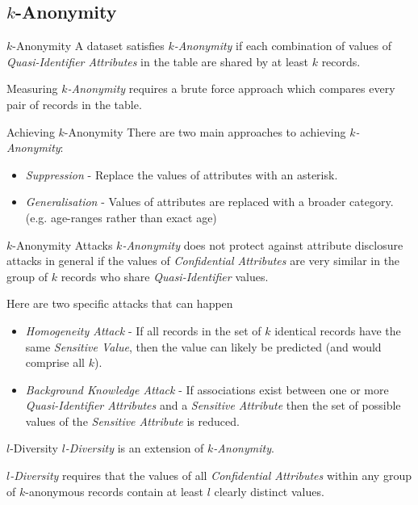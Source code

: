 \documentclass[11pt,a4paper]{article}
\begin{document}
\subsection{$k$-Anonymity}

  \begin{definition}{$k$-Anonymity}
    A dataset satisfies \textit{$k$-Anonymity} if each combination of values of \textit{Quasi-Identifier Attributes} in the table are shared by at least $k$ records.
    \par Measuring \textit{$k$-Anonymity} requires a brute force approach which compares every pair of records in the table.
  \end{definition}

  \begin{proposition}{Achieving $k$-Anonymity}
    There are two main approaches to achieving \textit{$k$-Anonymity}:
    \begin{itemize}
      \item \textit{Suppression} - Replace the values of attributes with an asterisk.
      \item \textit{Generalisation} - Values of attributes are replaced with a broader category. (e.g. age-ranges rather than exact age)
    \end{itemize}
  \end{proposition}

  \begin{proposition}{$k$-Anonymity Attacks}
    \textit{$k$-Anonymity} does not protect against attribute disclosure attacks in general if the values of \textit{Confidential Attributes} are very similar in the group of $k$ records who share \textit{Quasi-Identifier} values.
    \par Here are two specific attacks that can happen
    \begin{itemize}
      \item \textit{Homogeneity Attack} - If all records in the set of $k$ identical records have the same \textit{Sensitive Value}, then the value can likely be predicted (and would comprise all $k$).
      \item \textit{Background Knowledge Attack} - If associations exist between one or more \textit{Quasi-Identifier Attributes} and a \textit{Sensitive Attribute} then the set of possible values of the \textit{Sensitive Attribute} is reduced.
    \end{itemize}
  \end{proposition}

  \begin{definition}{$l$-Diversity}
    \textit{$l$-Diversity} is an extension of \textit{$k$-Anonymity}.
    \par \textit{$l$-Diversity} requires that the values of all \textit{Confidential Attributes} within any group of $k$-anonymous records contain at least $l$ clearly distinct values.
  \end{definition}
\end{document}

